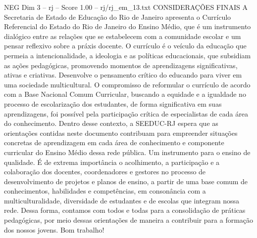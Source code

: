 \begin{textsample}{NEG Dim 3 – rj – Score 1.00 – rj/rj\_em\_13.txt}  \label{ex:f3_neg_272}
CONSIDERAÇÕES FINAIS A Secretaria de Estado de Educação do Rio de Janeiro apresenta o Currículo Referencial do Estado do Rio de Janeiro do Ensino Médio, que é um instrumento dialógico entre as relações que se estabelecem com a comunidade escolar e um pensar reflexivo sobre a práxis docente.
O currículo é o veículo da educação que permeia a intencionalidade, a ideologia e as políticas educacionais, que subsidiam as ações pedagógicas, promovendo momentos de aprendizagens significativas, ativas e criativas.
Desenvolve o pensamento crítico do educando para viver em uma sociedade multicultural.
O compromisso de reformular o currículo de acordo com a Base Nacional Comum Curricular, buscando a equidade e a igualdade no processo de escolarização dos estudantes, de forma significativa em suas aprendizagens, foi possível pela participação crítica de especialistas de cada área do conhecimento.
Dentro desse contexto, a SEEDUC-RJ espera que as orientações contidas neste documento contribuam para empreender situações concretas de aprendizagem em cada área de conhecimento e componente curricular do Ensino Médio dessa rede pública.
Um instrumento para o ensino de qualidade.
É de extrema importância o acolhimento, a participação e a colaboração dos docentes, coordenadores e gestores no processo de desenvolvimento de projetos e planos de ensino, a partir de uma base comum de conhecimentos, habilidades e competências, em consonância com a multiculturalidade, diversidade de estudantes e de escolas que integram nossa rede.
Dessa forma, contamos com todos e todas para a consolidação de práticas pedagógicas, por meio dessas orientações de maneira a contribuir para a formação dos nossos jovens.
Bom trabalho!

\end{textsample}
